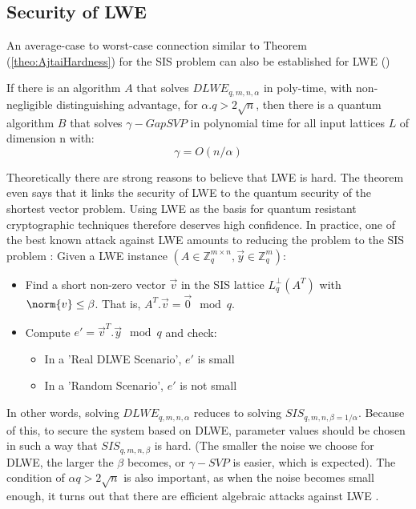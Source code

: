 \subsection{Security of LWE}
\label{sec:LWESecurity}
An average-case to worst-case connection similar to Theorem
(\ref{theo:AjtaiHardness}) for the SIS problem can also be established for LWE
(\cite{regev2005lattices})
\begin{theorem}
  If there is an algorithm $A$ that solves $DLWE_{q,m,n,\alpha}$ in poly-time,
  with non-negligible distinguishing advantage, for $\alpha . q > 2
  \sqrt{n}$, then there is a quantum algorithm $B$ that solves $\gamma-GapSVP$
  in polynomial time for all input lattices $L$ of dimension n with:
  \[
    \gamma = O(n/\alpha)
  \]

  \label{theo:RegevLWEHardness}
\end{theorem}
Theoretically there are strong reasons to believe that LWE is hard. The theorem
even says that it links the security of LWE to the quantum security of the
shortest vector problem. Using LWE as the basis for quantum resistant
cryptographic techniques therefore deserves high confidence. In practice, one of the
best known attack against LWE amounts to reducing the problem to the SIS
problem \cite{micciancio2009lattice}: Given a LWE instance
$(A \in \mathbb{Z}_q^{m \times n},\vec{y} \in \mathbb{Z}_q^m)$:
\begin{itemize}
\item Find a short non-zero vector $\vec{v}$ in the SIS lattice $L_q^\bot(A^T)$
  with $\norm{v} \leq \beta$. That is, $A^T.\vec{v} = \vec{0} \mod q$.
\item Compute $e' = \vec{v}^T.\vec{y} \mod q$ and check:
  \begin{itemize}
  \item In a 'Real DLWE Scenario', $e'$ is small
  \item In a 'Random Scenario', $e'$ is not small
  \end{itemize}
\end{itemize}

In other words, solving $DLWE_{q,m,n,\alpha}$ reduces to solving
$SIS_{q,m,n,\beta=1/\alpha}$. Because of this, to secure the system based on DLWE, parameter values should be chosen in such a way that $SIS_{q,m,n,\beta}$ is hard. (The smaller the
noise we choose for DLWE, the larger the $\beta$ becomes, or $\gamma-SVP$ is
easier, which is expected).  The condition of $\alpha q > 2\sqrt{n}$ is
also important, as when the noise becomes small enough, it turns out that there
are efficient algebraic attacks against LWE \cite{albrecht2014algebraic}.

